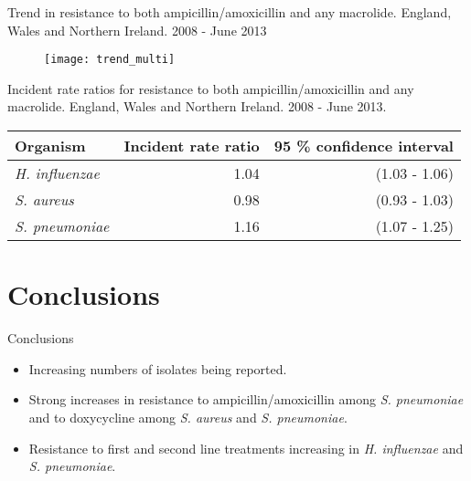 \documentclass{beamer}
\begin{document}
\begin{frame}{Trend in resistance to both ampicillin/amoxicillin and any macrolide. England, Wales and Northern Ireland. 2008 - June 2013}
\begin{figure}
\texttt{[image: trend\_multi]}
\end{figure}
\end{frame}

\begin{frame}{Incident rate ratios for resistance to both ampicillin/amoxicillin and any macrolide. England, Wales and Northern Ireland. 2008 - June 2013.}
\begin{table}[ht]
\centering
\begin{tabular}{lrr}
  \toprule
Organism & Incident rate ratio & 95 \% confidence interval \\ 
  \midrule
\textit{H. influenzae} & 1.04 & (1.03 - 1.06) \\ 
  \textit{S. aureus} & 0.98 & (0.93 - 1.03) \\ 
  \textit{S. pneumoniae} & 1.16 & (1.07 - 1.25) \\ 
   \bottomrule
\end{tabular}
\end{table}
\end{frame}


\section{Conclusions}
\begin{frame}{Conclusions}
\begin{itemize}
\item Increasing numbers of isolates being reported. 
\pause \item Strong increases in resistance to ampicillin/amoxicillin among \textit{S. pneumoniae} and to doxycycline among \textit{S. aureus} and \textit{S. pneumoniae}. 
\pause \item Resistance to first and second line treatments increasing in \textit{H. influenzae} and \textit{S. pneumoniae}. 
\end{itemize}
\end{frame}
\end{document}
